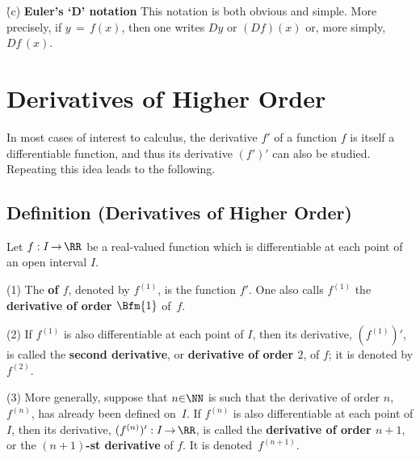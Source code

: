 \VA

        \h (c) {\bf Euler's `D' notation} This notation is both obvious and simple.
    More precisely, if $y \,=\, f(x)$, then one writes $Dy$ or $(Df)(x)$ or, more simply, $Df\,(x)$.


\VV

                \section{{\bf Derivatives of Higher Order}}
                \label{SectE20A}
        
\VV



        In most cases of interest to calculus, the derivative $f'$ of a function $f$ is itself a differentiable function,
    and thus its derivative $(f')'$ can also be studied. Repeating this idea leads to the following.

\V

            \subsection{\small{\bf Definition} (Derivatives of Higher Order)}
            \label{DefE20.80}

\V

        Let $f:I \,{\rightarrow}\, {\RR}$ be a real-valued function which is differentiable at each point of an open interval $I$.

\V

        (1) The {\bf {} of $f$}, denoted by $f^{(1)}$, is the function $f'$.
    One also calls $f^{(1)}$ the {\bf derivative of order $\Bfm{1}$} of~$f$.
    

\V

        (2) If $f^{(1)}$ is also differentiable at each point of $I$, then its derivative, $(f^{(1)})'$, is called the {\bf second derivative}, or {\bf derivative of order $2$}, of $f$; it is denoted by $f^{(2)}$.

\V

        (3) More generally, suppose that $n{\in}{\NN}$ is such that the derivative of order $n$, $f^{(n)}$, has already been defined on~$I$.
    If $f^{(n)}$ is also differentiable at each point of $I$, then its derivative, $(f^{(n)})':I \,{\rightarrow}\, {\RR}$,
    is called the {\bf derivative of order $n+1$}, or the {\bf $(n+1)$-st derivative} of $f$. It is denoted~$f^{(n+1)}$.

